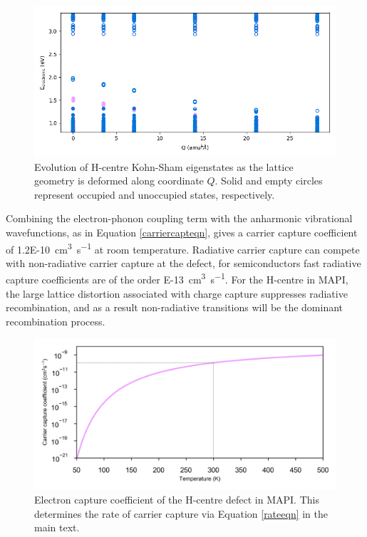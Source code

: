 \begin{figure}[h!]   
\centering
  \includegraphics[width=1.0\columnwidth]{figures/ch6/eigs.png}
  \caption[Evolution of the H-centre Kohn-Sham eigenstates]{Evolution of H-centre Kohn-Sham eigenstates as the lattice geometry is deformed along coordinate $Q$.  Solid and empty circles represent occupied and unoccupied states, respectively.}
\label{eigenvalues}
\end{figure}

Combining the electron-phonon coupling term with the anharmonic vibrational wavefunctions, as in Equation \ref{carriercapteqn}, gives a carrier capture coefficient of \SI{1.2E-10}{\centi\metre\cubed\per\second} at room temperature.
Radiative carrier capture can compete with non-radiative carrier capture at the defect, for semiconductors fast radiative capture coefficients are of the order \SI{E-13}{\centi\metre\cubed\per\second}.\autocite{Alkauskas2014}
For the H-centre in MAPI, the large lattice distortion associated with charge capture suppresses radiative recombination, and as a result non-radiative transitions will be the dominant recombination process.

\begin{figure}[h!]   
\centering
  \includegraphics[width=1.0\columnwidth]{figures/ch6/carrier_capture_rate.png}
  \caption[H-centre electron capture coefficient]{Electron capture coefficient of the H-centre defect in MAPI. This determines the rate of carrier capture via Equation \ref{rateeqn} in the main text.}
\label{carrier_capture_rate}
\end{figure}

